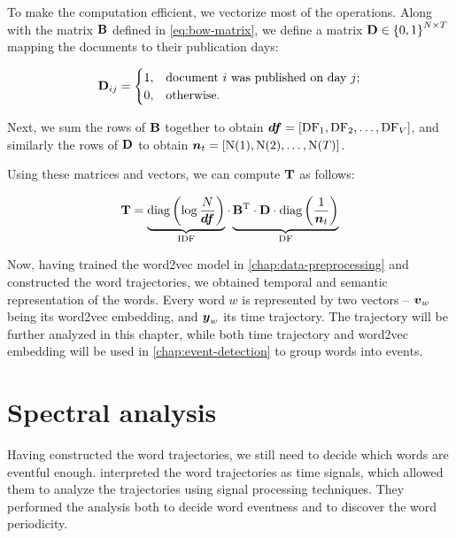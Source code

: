 To make the computation efficient, we vectorize most of the operations. Along with the matrix $\mathbf{B}$ defined in \ref{eq:bow-matrix}, we define a matrix $\mathbf{D} \in \left\{ 0, 1 \right\}^{N \times T}$ mapping the documents to their publication days:

\begin{equation}
	\mathbf{D}_{ij} =
	\begin{cases}
		1, & \text{document}~i~\text{was published on day}~j \text{;} \\
		0, & \text{otherwise}.
	\end{cases}
\end{equation}

Next, we sum the rows of $\mathbf{B}$ together to obtain $\vect{\df} = \left[ \text{\df}_{1}, \text{\df}_{2}, \dots, \text{\df}_{\featcount} \right]$, and similarly the rows of $\mathbf{D}$ to obtain $\vect{\doccount}_{t} = \left[ \text{\doccount}(1), \text{\doccount}(2), \dots, \text{\doccount}(\streamlen) \right]$.

Using these matrices and vectors, we can compute $\mathbf{T}$ as follows:

\begin{equation}
	\trajmat =
		\underbrace{\text{diag} \left( \log{\frac{\doccount}{\vect{\df}}} \right)}_{\text{IDF}}
		\cdot
		\underbrace{\bowmat^{\T}
		\cdot \dtdmat
		\cdot \text{diag} \left( \frac{1}{\vect{\doccount}_{t}} \right)}_{\text{DF}}
\end{equation}

Now, having trained the word2vec model in \autoref{chap:data-preprocessing} and constructed the word trajectories, we obtained temporal and semantic representation of the words. Every word $w$ is represented by two vectors -- $\embed_{w}$ being its word2vec embedding, and $\vect{\traj}_{w}$ its time trajectory. The trajectory will be further analyzed in this chapter, while both time trajectory and word2vec embedding will be used in \autoref{chap:event-detection} to group words into events.


\section{Spectral analysis}
Having constructed the word trajectories, we still need to decide which words are eventful enough. \cite{event-detection} interpreted the word trajectories as time signals, which allowed them to analyze the trajectories using signal processing techniques. They performed the analysis both to decide word eventness and to discover the word periodicity.

